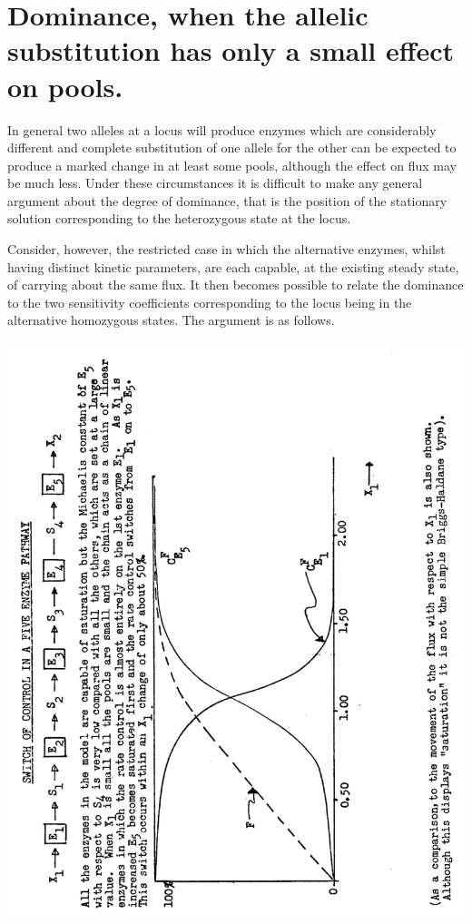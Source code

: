 \section{Dominance, when the allelic substitution has only a small effect on pools.}

In general two alleles at a locus will produce enzymes which are considerably different and complete substitution of one allele for the other can be expected to produce a marked change in at least some pools, although the effect on flux may be much less. Under these circumstances it is difficult to make any general argument about the degree of dominance, that is the position of the stationary solution corresponding to the heterozygous state at the locus.

Consider, however, the restricted case in which the alternative enzymes, whilst having distinct kinetic parameters, are each capable, at the existing steady state, of carrying about the same flux. It then becomes possible to relate the dominance to the two sensitivity coefficients corresponding to the locus being in the alternative homozygous states. The argument is as follows.

\begin{center}
\includegraphics[max width=1\textwidth]{figure5_burnssim.png}
\end{center}


